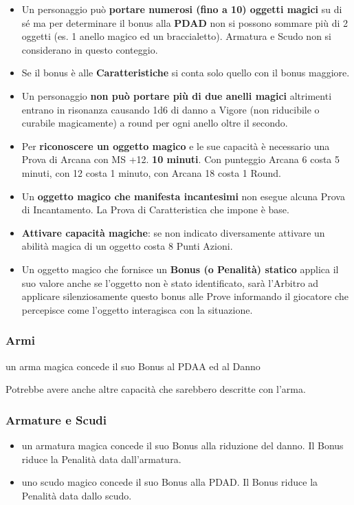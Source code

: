 \documentclass[12pt,a4paper,twoside,openany]{book}
\begin{document}
\begin{multicols}{2}
\label{oggetti-magici}
\begin{itemize}
	\item
Un personaggio può \textbf{portare numerosi (fino a 10) oggetti magici} su di sé ma per determinare il bonus alla \textbf{PDAD} non si possono sommare più di 2 oggetti (es. 1 anello magico ed un braccialetto). Armatura e Scudo non si considerano in questo conteggio.
\item
Se il bonus è alle \textbf{Caratteristiche} si conta solo quello con il bonus maggiore.
\item
Un personaggio \textbf{non può portare più di due anelli magici} altrimenti entrano in risonanza causando 1d6 di danno a Vigore (non riducibile o curabile magicamente) a round per ogni anello oltre il secondo.
\item
Per \textbf{riconoscere un oggetto magico} e le sue capacità è necessario una Prova di Arcana con MS +12. \textbf{10 minuti}. Con punteggio Arcana 6 costa 5 minuti, con 12 costa 1 minuto, con Arcana 18 costa 1 Round.
\item
Un \textbf{oggetto magico che manifesta incantesimi} non esegue alcuna Prova di Incantamento. La Prova di Caratteristica che impone è base.
\item
\textbf{Attivare capacità magiche}: se non indicato diversamente attivare un abilità magica di un oggetto costa 8 Punti Azioni.
\item
Un oggetto magico che fornisce un \textbf{Bonus (o Penalità) statico} applica il suo valore anche se l'oggetto non è stato identificato, sarà l'Arbitro ad applicare silenziosamente questo bonus alle Prove informando il giocatore che percepisce come l'oggetto interagisca con la situazione.

\end{itemize}

\subsubsection{Armi}

un arma magica concede il suo Bonus al PDAA  ed al Danno

Potrebbe avere anche altre capacità che sarebbero descritte con l'arma.

\subsubsection{Armature e Scudi}

\begin{itemize}
\item 
un armatura magica concede il suo Bonus alla riduzione del danno. Il Bonus riduce la Penalità data dall'armatura.
\item 
uno scudo magico concede il suo Bonus alla PDAD. Il Bonus riduce la Penalità data dallo scudo.


\end{itemize}
\end{multicols}
\end{document}
